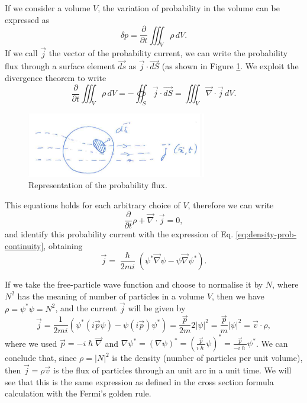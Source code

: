     If we consider a volume $V$, the variation of probability in the volume can be expressed as 
    \begin{equation*}
        \delta p = \frac{\partial}{\partial t}\iiint_{V} \rho\,dV.
    \end{equation*}
    If we call $\Vec{j}$ the vector of the probability current, we can write the probability flux through a surface element $\Vec{ds}$ as $\Vec{j}\cdot\Vec{dS}$ (as shown in Figure \ref{fig:probability-current}. We exploit the divergence theorem to write
    \begin{equation*}
        \frac{\partial}{\partial t}\iiint_{V} \rho \,dV = -\oiint_{S} \Vec{j}\cdot\Vec{dS} = \iiint_V \Vec{\nabla}\cdot\Vec{j} \,dV.
    \end{equation*}
    \begin{figure}
        \centering
        \includegraphics[width=0.7\textwidth]{Figures/probability-current}
        \caption{Representation of the probability flux.}
        \label{fig:probability-current}
    \end{figure}
    This equations holds for each arbitrary choice of $V$, therefore we can write
    \begin{equation*}
        \frac{\partial}{\partial t}\rho + \Vec{\nabla}\cdot\Vec{j} = 0,
    \end{equation*}
    and identify this probability current with the expression of Eq. \eqref{eq:density-prob-continuity}, obtaining
    \begin{equation*}
        \Vec{j} = \frac{\hslash}{2mi}\left(\psi^*\Vec{\nabla}\psi - \psi\Vec{\nabla}\psi^*\right).
    \end{equation*}
    
    If we take the free-particle wave function and choose to normalise it by $N$, where $N^2$ has the meaning of number of particles in a volume $V$, then we  have $\rho = \psi^*\psi = N^2$, and the current $\Vec{j}$ will be  given by
    \begin{equation*}
        \Vec{j} = \frac{1}{2mi}\left(\psi^*(i\Vec{p}\psi)-\psi(i\Vec{p})\psi^*\right) = \frac{\Vec{p}}{2m}2\left|\psi\right|^2 = \frac{\Vec{p}}{m}\left|\psi\right|^2 = \Vec{v}\cdot \rho,
    \end{equation*}
    where we used \(\Vec{p}=-i\hslash\Vec{\nabla}\) and \(\nabla\psi^*=(\nabla\psi)^*=(\frac{\Vec{p}}{i\hslash}\psi)^*=\frac{\Vec{p}}{-i\hslash}\psi^*\).
    We can conclude that, since $\rho = |N|^2$ is the density (number of particles per unit volume),  then $\Vec{j} = \rho\Vec{v}$ is the flux of particles through an unit arc in a unit time. We will see that this is the same expression as defined in the cross section formula calculation with the Fermi's golden rule.


